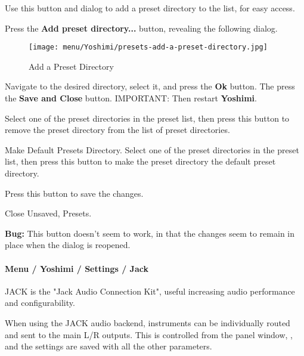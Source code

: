    Use this button and dialog to add a preset directory to the list, for
   easy access.

   Press the \textbf{Add preset directory...} button, revealing the
   following dialog.

\begin{figure}[H]
   \centering 
   \texttt{[image: menu/Yoshimi/presets-add-a-preset-directory.jpg]}
   \caption[Add Preset Directory]{Add a Preset Directory}
   \label{fig:presets_add_a_preset_directory}
\end{figure}

   Navigate to the desired directory, select it, and press the \textbf{Ok}
   button.  The press the \textbf{Save and Close} button.
   IMPORTANT:  Then restart \textbf{Yoshimi}.

   Select one of the preset directories in the preset list, then press this
   button to remove the preset directory from the list of preset
   directories.

   Make Default Presets Directory.
   Select one of the preset directories in the preset list, then press this
   button to make the preset directory the default preset directory.

   Press this button to save the changes.

   Close Unsaved, Presets.
   
   \textbf{Bug:}
   This button doesn't seem to work, in that the changes seem to remain
   in place when the dialog is reopened.

\paragraph{Menu / Yoshimi / Settings / Jack}
\label{paragraph:menu_yoshimi_settings_jack}

   JACK is the "Jack Audio Connection Kit", useful increasing audio
   performance and configurability.

   When using the JACK audio backend, instruments can be individually routed
   and sent to the main L/R outputs. This is controlled from the
   panel window,
   ,
   and the settings are saved with all the other parameters.

